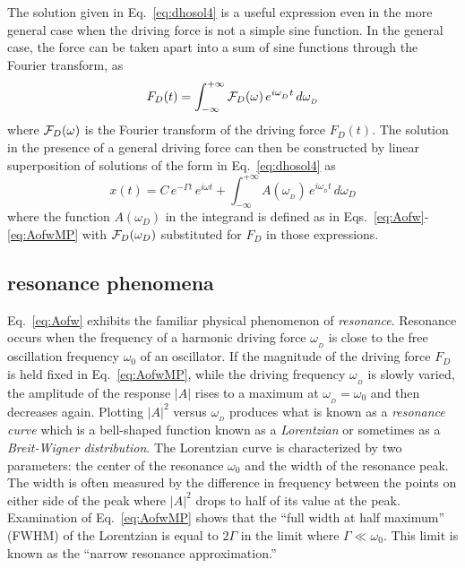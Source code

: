 \documentclass{revtex4}
\begin{document}
The solution given in Eq.~\ref{eq:dhosol4} is a useful expression even in
the more general case when the driving force is not a simple sine function.
In the general case, the force can be taken apart into a sum of
sine functions through the Fourier transform, as 
\begin{equation}
F_D(t) = \int_{-\infty}^{+\infty}{\cal F}_D
(\omega)\, e^{i\omega_{_D} t}\,d\omega_{_D}
\end{equation}
where ${\cal F}_D(\omega)$ is the Fourier transform of the driving
force $F_D(t)$.  The solution in the presence of a general driving force
can then be constructed by linear superposition of solutions of the form
in Eq.~\ref{eq:dhosol4} as
\begin{equation}
x(t) = C\,e^{-\Gamma t}\,e^{i\omega t} + \int_{-\infty}^{+\infty}
A(\omega_{_D})\,e^{i\omega_{_D} t}\,d\omega_D
\label{eq:dhosol5}
\end{equation}
where the function $A(\omega_D)$ in the integrand is defined as in
Eqs.~\ref{eq:Aofw}-\ref{eq:AofwMP} with ${\cal F}_D(\omega_D)$
substituted for $F_D$ in those expressions.

\subsection{resonance phenomena}

Eq.~\ref{eq:Aofw} exhibits the familiar physical phenomenon of {\em resonance}.
Resonance occurs when the frequency of a harmonic driving force $\omega_{_D}$
is close to the free oscillation frequency $\omega_0$ of an oscillator.  If
the magnitude of the driving force $F_D$ is held fixed in Eq.~\ref{eq:AofwMP},
while the driving frequency $\omega_{_D}$ is slowly varied, the amplitude of
the response $|A|$ rises to a maximum at $\omega_{_D}=\omega_0$ and then
decreases again.  Plotting $|A|^2$ versus $\omega_{_D}$ produces what is known
as a {\em resonance curve} which is a bell-shaped function known as a
{\em Lorentzian} or sometimes as a {\em Breit-Wigner distribution}.  The
Lorentzian curve is characterized by two parameters: the center of the
resonance $\omega_0$ and the width of the resonance peak.  The width is
often measured by the difference in frequency between the points on either
side of the peak where $|A|^2$ drops to half of its value at the peak.
Examination of Eq.~\ref{eq:AofwMP} shows that the ``full width at half
maximum'' (FWHM) of the Lorentzian is equal to $2\Gamma$ in the limit
where $\Gamma \ll \omega_0$.  This limit is known as the ``narrow resonance
approximation.''
\end{document}
